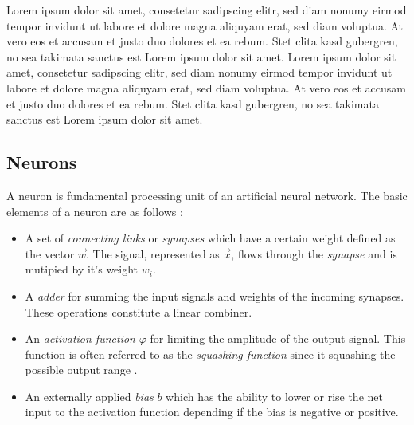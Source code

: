 Lorem ipsum dolor sit amet, consetetur sadipscing elitr, sed diam nonumy eirmod tempor invidunt ut labore et dolore magna aliquyam erat, sed diam voluptua. At vero eos et accusam et justo duo dolores et ea rebum. Stet clita kasd gubergren, no sea takimata sanctus est Lorem ipsum dolor sit amet. Lorem ipsum dolor sit amet, consetetur sadipscing elitr, sed diam nonumy eirmod tempor invidunt ut labore et dolore magna aliquyam erat, sed diam voluptua. At vero eos et accusam et justo duo dolores et ea rebum. Stet clita kasd gubergren, no sea takimata sanctus est Lorem ipsum dolor sit amet.

\subsection{Neurons}

A neuron is fundamental processing unit of an artificial neural network. The basic elements of a neuron are as follows \cite{Haykin:1998:NNC:521706}:
\begin{itemize}
  \item A set of \textit{connecting links} or \textit{synapses} which have a certain weight defined as the vector $\vec{w}$. The signal, represented as $\vec{x}$, flows through the \textit{synapse} and is mutipied by it's weight $w_i$.
  \item A \textit{adder} for summing the input signals and weights of the incoming synapses. These operations constitute a linear combiner.
  \item An \textit{activation function} $\varphi$ for limiting the amplitude of the output signal. This function is often referred to as the \textit{squashing function} since it squashing the possible output range \cite{Haykin:1998:NNC:521706}.
  \item An externally applied \textit{bias} $b$ which has the ability to lower or rise the net input to the activation function depending if the bias is negative or positive.
\end{itemize}
